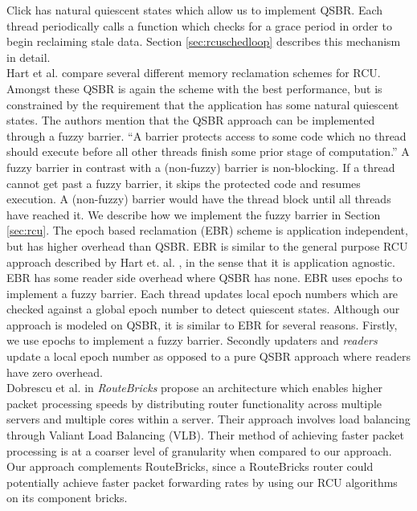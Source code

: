 \documentclass[a4paper]{article}
\begin{document}
Click has natural quiescent states which allow us to implement QSBR. Each thread periodically calls a function which checks for a grace period in order to begin reclaiming stale data. Section \ref{sec:rcuschedloop} describes this mechanism in detail.\\

Hart et al. \cite{hart} compare several different memory reclamation schemes for RCU. Amongst these QSBR is again the scheme with the best performance, but is constrained by the requirement that the application has some natural quiescent states. The authors mention that the QSBR approach can be implemented through a fuzzy barrier. ``A barrier protects access to some code which no thread should execute before all other threads finish some prior stage of computation.'' A fuzzy barrier in contrast with a (non-fuzzy) barrier is non-blocking. If a thread cannot get past a fuzzy barrier, it skips the protected code and resumes execution. A (non-fuzzy) barrier would have the thread block until all threads have reached it. We describe how we implement the fuzzy barrier in Section \ref{sec:rcu}. The epoch based reclamation (EBR) scheme is application independent, but has higher overhead than QSBR. EBR is similar to the general purpose RCU approach described by Hart et. al. \cite{urcu}, in the sense that it is application agnostic. EBR has some reader side overhead where QSBR has none. EBR uses epochs to implement a fuzzy barrier. Each thread updates local epoch numbers which are checked against a global epoch number to detect quiescent states. Although our approach is modeled on QSBR, it is similar to EBR for several reasons. Firstly, we use epochs to implement a fuzzy barrier. Secondly updaters and \emph{readers} update a local epoch number as opposed to a pure QSBR approach where readers have zero overhead.\\

Dobrescu et al. \cite{routebricks} in \emph{RouteBricks} propose an architecture which enables higher packet processing speeds by distributing router functionality across multiple servers and multiple cores within a server. Their approach involves load balancing through Valiant Load Balancing (VLB). Their method of achieving faster packet processing is at a coarser level of granularity when compared to our approach. Our approach complements RouteBricks, since a RouteBricks router could potentially achieve faster packet forwarding rates by using our RCU algorithms on its component bricks.\\
\end{document}

